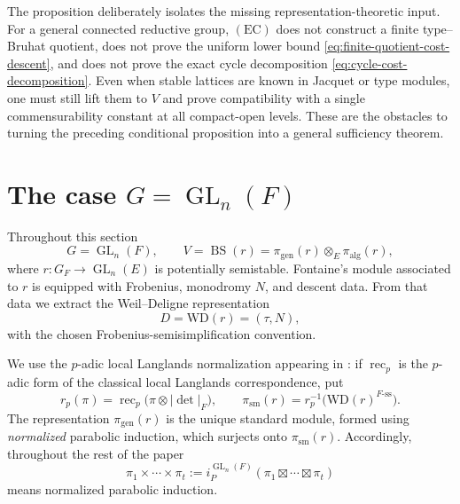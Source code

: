 \documentclass[12pt]{article}
\theoremstyle{definition}
\theoremstyle{remark}
\DeclareMathOperator{\GL}{GL}
\begin{document}
The proposition deliberately isolates the missing representation-theoretic
input.  For a general connected reductive group, $(\mathrm{EC})$ does not
construct a finite type--Bruhat quotient, does not prove the uniform lower
bound \eqref{eq:finite-quotient-cost-descent}, and does not prove the exact
cycle decomposition \eqref{eq:cycle-cost-decomposition}.  Even when stable
lattices are known in Jacquet or type modules, one must still lift them to
$V$ and prove compatibility with a single commensurability constant at all
compact-open levels.  These are the obstacles to turning the preceding
conditional proposition into a general sufficiency theorem.




\section{\texorpdfstring{The case $G=\GL_n(F)$}
{The case G=GLn(F)}}
\label{sec:GLn}

Throughout this section
\[
 G=\GL_n(F),
 \qquad
 V=\operatorname{BS}(r)
 =\pi_{\mathrm{gen}}(r)\otimes_E\pi_{\mathrm{alg}}(r),
\]
where $r:G_F\to\GL_n(E)$ is potentially semistable.  Fontaine's module associated to $r$ is equipped with Frobenius, monodromy $N$, and descent data. From that data we extract the Weil--Deligne representation
\[
 D=\mathrm{WD}(r)=(\tau,N),
\]
with the chosen Frobenius-semisimplification convention.

We use the $p$-adic local Langlands normalization appearing in
\cite{Pyvovarov2021}: if $\operatorname{rec}_p$ is the $p$-adic form of the
classical local Langlands correspondence, put
\[
 r_p(\pi)=\operatorname{rec}_p\bigl(\pi\otimes|\det|_F\bigr),
 \qquad
 \pi_{\mathrm{sm}}(r)
 =r_p^{-1}\bigl(\mathrm{WD}(r)^{F\text{-}\mathrm{ss}}\bigr).
\]
The representation $\pi_{\mathrm{gen}}(r)$ is the unique standard module,
formed using \emph{normalized} parabolic induction, which surjects onto
$\pi_{\mathrm{sm}}(r)$.  Accordingly, throughout the rest of the paper
\[
 \pi_1\times\cdots\times\pi_t
 :=i_P^{\GL_n(F)}(\pi_1\boxtimes\cdots\boxtimes\pi_t)
\]
means normalized parabolic induction.
\end{document}
